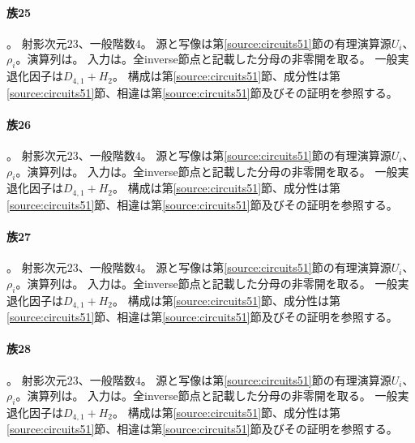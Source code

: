 \paragraph{族25}\label{catalogue:T25}
。
射影次元$23$、一般階数$4$。
源と写像は第\ref{source:circuits51}節の有理演算源$U_i$、$\rho_i$。演算列は。
入力は。全inverse節点と記載した分母の非零開を取る。
一般実退化因子は$D_{4,1}+H_{2}$。
構成は第\ref{source:circuits51}節、成分性は第\ref{source:circuits51}節、相違は第\ref{source:circuits51}節及びその証明を参照する。

\paragraph{族26}\label{catalogue:T26}
。
射影次元$23$、一般階数$4$。
源と写像は第\ref{source:circuits51}節の有理演算源$U_i$、$\rho_i$。演算列は。
入力は。全inverse節点と記載した分母の非零開を取る。
一般実退化因子は$D_{4,1}+H_{2}$。
構成は第\ref{source:circuits51}節、成分性は第\ref{source:circuits51}節、相違は第\ref{source:circuits51}節及びその証明を参照する。

\paragraph{族27}\label{catalogue:T27}
。
射影次元$23$、一般階数$4$。
源と写像は第\ref{source:circuits51}節の有理演算源$U_i$、$\rho_i$。演算列は。
入力は。全inverse節点と記載した分母の非零開を取る。
一般実退化因子は$D_{4,1}+H_{2}$。
構成は第\ref{source:circuits51}節、成分性は第\ref{source:circuits51}節、相違は第\ref{source:circuits51}節及びその証明を参照する。

\paragraph{族28}\label{catalogue:T28}
。
射影次元$23$、一般階数$4$。
源と写像は第\ref{source:circuits51}節の有理演算源$U_i$、$\rho_i$。演算列は。
入力は。全inverse節点と記載した分母の非零開を取る。
一般実退化因子は$D_{4,1}+H_{2}$。
構成は第\ref{source:circuits51}節、成分性は第\ref{source:circuits51}節、相違は第\ref{source:circuits51}節及びその証明を参照する。

